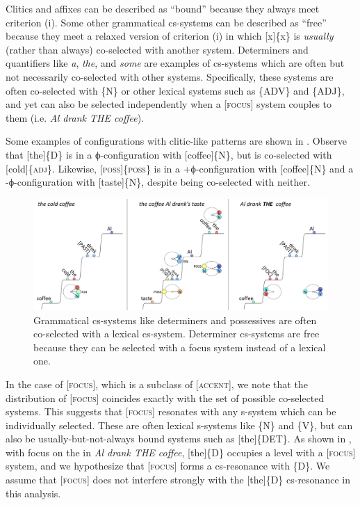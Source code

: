  Clitics and affixes can be described as “bound” because they always meet criterion (i). Some other grammatical cs-systems can be described as “free” because they meet a relaxed version of criterion (i) in which [x]\{x\} is \textit{usually} (rather than always) co-selected with another system. Determiners and quantifiers like \textit{a}, \textit{the}, and \textit{some} are examples of cs-systems which are often but not necessarily co-selected with other systems. Specifically, these systems are often co-selected with \{N\} or other lexical systems such as \{A\textsc{DV}\} and \{A\textsc{DJ}\}, and yet can also be selected independently when a [\textsc{focus}] system couples to them (i.e. \textit{Al drank THE coffee}).

  Some examples of configurations with clitic-like patterns are shown in {}. Observe that [the]\{\textsc{D}\} is in a ϕ-configuration with [coffee]\{N\}, but is co-selected with [cold]\{\textsc{adj}\}. Likewise, [\textsc{poss}]\{\textsc{poss}\} is in a +ϕ-configuration with [coffee]\{N\} and a -ϕ-configuration with [taste]\{N\}, despite being co-selected with neither. 

  
\begin{figure}
\includegraphics[width=\textwidth]{figures/Tilsen-img68.png}
\caption{Grammatical cs-systems like determiners and possessives are often co-selected with a lexical cs-system. Determiner cs-systems are free because they can be selected with a focus system instead of a lexical one.}
\label{fig:4:18}
\end{figure}
 

  In the case of [\textsc{focus}], which is a subclass of [\textsc{accent}], we note that the distribution of [\textsc{focus}] coincides exactly with the set of possible co-selected systems. This suggests that [\textsc{focus}] resonates with any s-system which can be individually selected. These are often lexical s-systems like \{N\} and \{V\}, but can also be usually-but-not-always bound systems such as [the]\{DET\}. As shown in {}, with focus on the  in \textit{Al drank THE coffee}, [the]\{D\} occupies a level with a [\textsc{focus}] system, and we hypothesize that [\textsc{focus}] forms a cs-resonance with \{D\}. We assume that [\textsc{focus}] does not interfere strongly with the [the]\{D\} cs-resonance in this analysis.

